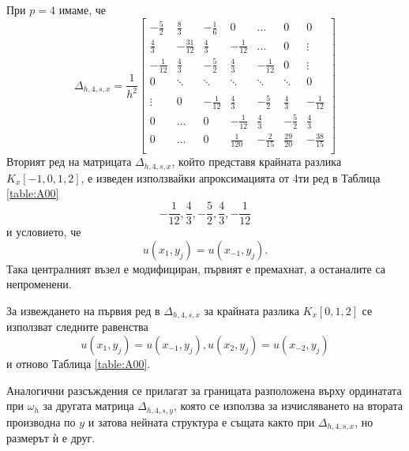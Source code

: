 \documentclass[a4paper]{article}
\theoremstyle{remark}
\begin{document}
При $p=4$ имаме, че 
\[
\Delta_{h,4,s,x} = \frac{1}{h^2}
\begin{bmatrix}
     -\frac{5}{2}	& \frac{8}{3}       & -\frac{1}{6}	&    0     			&    \dots      	   &   0           & 0    \\
    \frac{4}{3}          &-\frac{31}{12}    	& \frac{4}{3}	&   -\frac{1}{12}	  	&   \dots      	  &   0	           & \vdots  \\
    -\frac{1}{12}	& \frac{4}{3}         	& -\frac{5}{2}	&  \frac{4}{3}    	 &   -\frac{1}{12}	  &      0           &\vdots    \\
        0           		& \ddots        	&    \ddots   		 &   \ddots      	 &     \ddots      	  &  \ddots        &    0 \\	
\\
   \vdots      		 & 0           		 &  -\frac{1}{12}	& \frac{4}{3}    	& -\frac{5}{2}	&  \frac{4}{3}   &   -\frac{1}{12} \\
    0      		 &  \dots           	 &   0     		& -\frac{1}{12} 	 & \frac{4}{3} 	 & -\frac{5}{2}  &  \frac{4}{3}\\
    0              		 & \dots          	&  0              		 &\frac{1}{120} 	 &  -\frac{2}{15} 	& \frac{29}{20} & -\frac{38}{15}\\
\end{bmatrix}
\]
Вторият ред на матрицата $\Delta_{h,4,s,x}$, който представя крайната разлика $K_x[-1,0,1,2]$, е изведен използвайки апроксимацията от 4ти ред в Таблица \ref{table:A00}
$$ -\frac{1}{12}, \frac{4}{3}, -\frac{5}{2},  \frac{4}{3}, -\frac{1}{12} $$ и условието, че
$$u(x_1, y_j) = u(x_{-1}, y_j).$$
Така централният възел е модифициран, първият е премахнат, а останалите са непроменени. 

За извеждането на първия ред в $\Delta_{h,4,s,x}$ за крайната разлика $K_x[0,1,2]$ се използват следните равенства
$$u(x_1, y_j) = u(x_{-1}, y_j), u(x_2, y_j) = u(x_{-2}, y_j)$$
и отново Таблица \ref{table:A00}.

Аналогични разсъждения се прилагат за границата разположена върху ординатата при $\omega_h$ за другата матрица $\Delta_{h,4,s,y}$, която се използва за изчисляването на втората производна по $y$ и затова нейната структура е същата както при $\Delta_{h,4,s,x}$, но размерът ѝ е друг.
\end{document}
